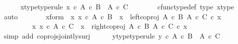 \begin{isabellebody}
\isanewline
\ \ \ \ \isamarkupfalse%
\ x{\isacharunderscore}{\kern0pt}type{\isacharbrackleft}{\kern0pt}type{\isacharunderscore}{\kern0pt}rule{\isacharbrackright}{\kern0pt}{\isacharcolon}{\kern0pt}\ {\isachardoublequoteopen}x\ {\isasymin}\isactrlsub c\ {\isacharparenleft}{\kern0pt}A\ {\isasymtimes}\isactrlsub c\ B{\isacharparenright}{\kern0pt}\ {\isasymCoprod}\ {\isacharparenleft}{\kern0pt}A\ {\isasymtimes}\isactrlsub c\ C{\isacharparenright}{\kern0pt}{\isachardoublequoteclose}\isanewline
\ \ \ \ \ \ \isamarkupfalse%
\ cfunc{\isacharunderscore}{\kern0pt}type{\isacharunderscore}{\kern0pt}def\ {\isasymphi}{\isacharunderscore}{\kern0pt}type\ x{\isacharunderscore}{\kern0pt}type\ \isamarkupfalse%
\ auto\isanewline
\ \ \ \ \isamarkupfalse%
\ \isamarkupfalse%
\ x{\isacharunderscore}{\kern0pt}form{\isacharcolon}{\kern0pt}\ {\isachardoublequoteopen}{\isacharparenleft}{\kern0pt}{\isasymexists}\ x{\isacharprime}{\kern0pt}{\isachardot}{\kern0pt}\ x{\isacharprime}{\kern0pt}\ {\isasymin}\isactrlsub c\ A\ {\isasymtimes}\isactrlsub c\ B\ {\isasymand}\ x\ {\isacharequal}{\kern0pt}\ {\isacharparenleft}{\kern0pt}left{\isacharunderscore}{\kern0pt}coproj\ {\isacharparenleft}{\kern0pt}A\ {\isasymtimes}\isactrlsub c\ B{\isacharparenright}{\kern0pt}\ {\isacharparenleft}{\kern0pt}A\ {\isasymtimes}\isactrlsub c\ C{\isacharparenright}{\kern0pt}{\isacharparenright}{\kern0pt}\ {\isasymcirc}\isactrlsub c\ x{\isacharprime}{\kern0pt}{\isacharparenright}{\kern0pt}\isanewline
\ \ \ \ \ \ {\isasymor}\ \ {\isacharparenleft}{\kern0pt}{\isasymexists}\ x{\isacharprime}{\kern0pt}{\isachardot}{\kern0pt}\ x{\isacharprime}{\kern0pt}\ {\isasymin}\isactrlsub c\ A\ {\isasymtimes}\isactrlsub c\ C\ {\isasymand}\ x\ {\isacharequal}{\kern0pt}\ {\isacharparenleft}{\kern0pt}right{\isacharunderscore}{\kern0pt}coproj\ {\isacharparenleft}{\kern0pt}A\ {\isasymtimes}\isactrlsub c\ B{\isacharparenright}{\kern0pt}\ {\isacharparenleft}{\kern0pt}A\ {\isasymtimes}\isactrlsub c\ C{\isacharparenright}{\kern0pt}{\isacharparenright}{\kern0pt}\ {\isasymcirc}\isactrlsub c\ x{\isacharprime}{\kern0pt}{\isacharparenright}{\kern0pt}{\isachardoublequoteclose}\isanewline
\ \ \ \ \ \ \isamarkupfalse%
\ {\isacharparenleft}{\kern0pt}simp\ add{\isacharcolon}{\kern0pt}\ coprojs{\isacharunderscore}{\kern0pt}jointly{\isacharunderscore}{\kern0pt}surj{\isacharparenright}{\kern0pt}\isanewline
\ \ \ \ \isamarkupfalse%
\ y{\isacharunderscore}{\kern0pt}type{\isacharbrackleft}{\kern0pt}type{\isacharunderscore}{\kern0pt}rule{\isacharbrackright}{\kern0pt}{\isacharcolon}{\kern0pt}\ {\isachardoublequoteopen}y\ {\isasymin}\isactrlsub c\ {\isacharparenleft}{\kern0pt}A\ {\isasymtimes}\isactrlsub c\ B{\isacharparenright}{\kern0pt}\ {\isasymCoprod}\ {\isacharparenleft}{\kern0pt}A\ {\isasymtimes}\isactrlsub c\ C{\isacharparenright}{\kern0pt}{\isachardoublequoteclose}\isanewline

\end{isabellebody}
